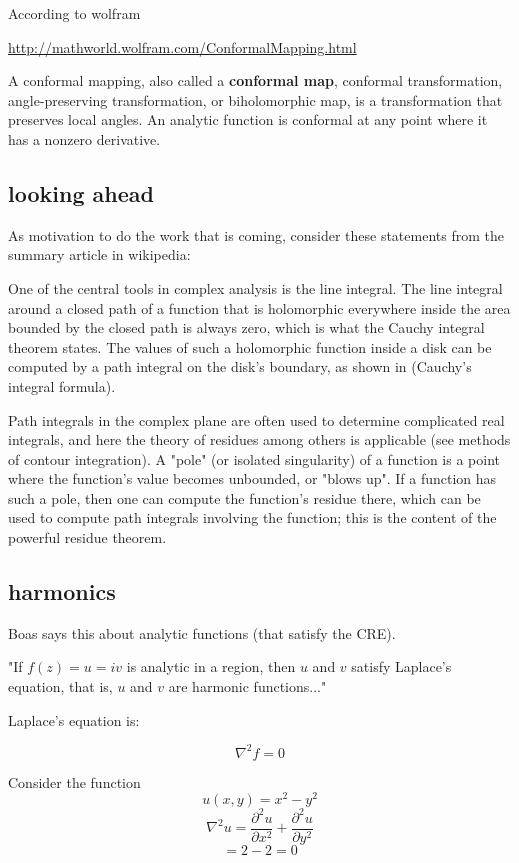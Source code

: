 \documentclass[11pt, oneside]{article}
\begin{document}
According to wolfram

\url{http://mathworld.wolfram.com/ConformalMapping.html}

A conformal mapping, also called a \textbf{conformal map}, conformal transformation, angle-preserving transformation, or biholomorphic map, is a transformation that preserves local angles. An analytic function is conformal at any point where it has a nonzero derivative.

\subsection*{looking ahead}
As motivation to do the work that is coming, consider these statements from the summary article in wikipedia:

    One of the central tools in complex analysis is the line integral. The line integral around a closed path of a function that is holomorphic everywhere inside the area bounded by the closed path is always zero, which is what the Cauchy integral theorem states. The values of such a holomorphic function inside a disk can be computed by a path integral on the disk's boundary, as shown in (Cauchy's integral formula). 
    
    Path integrals in the complex plane are often used to determine complicated real integrals, and here the theory of residues among others is applicable (see methods of contour integration). A "pole" (or isolated singularity) of a function is a point where the function's value becomes unbounded, or "blows up". If a function has such a pole, then one can compute the function's residue there, which can be used to compute path integrals involving the function; this is the content of the powerful residue theorem.
    
\subsection*{harmonics}
Boas says this about analytic functions (that satisfy the CRE).

"If $f(z) = u = iv$ is analytic in a region, then $u$ and $v$ satisfy Laplace's equation, that is, $u$ and $v$ are harmonic functions..."

Laplace's equation is:

\[ \nabla^2 f = 0 \]

Consider the function 
\[ u(x,y) = x^2 - y^2 \]
\[ \nabla^2 u = \frac{\partial^2 u}{\partial x^2} +  \frac{\partial^2 u}{\partial y^2} \]
\[ = 2 - 2 = 0 \]
\end{document}
